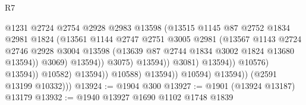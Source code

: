 \begin{lexlean}{R7}
\begin{coremodule}
                                              @1231
                                              @2724
                                              @2754
                                              @2928
                                              @2983
                                              @13598
                                              (@13515
                                                @1145
                                                @87
                                                @2752
                                                @1834
                                                @2981
                                                @1824
                                                (@13561
                                                  @1144
                                                  @2747
                                                  @2751
                                                  @3005
                                                  @2981
                                                  (@13567
                                                    @1143
                                                    @2724
                                                    @2746
                                                    @2928
                                                    @3004
                                                    @13598
                                                    (@13639
                                                      @87
                                                      @2744
                                                      @1834
                                                      @3002
                                                      @1824
                                                      @13680
                                                      @13594))
                                                  @3069)
                                                @13594))
                                            @3075)
                                          @13594))
                                      @3081)
                                    @13594))
                                @10576)
                              @13594))
                          @10582)
                        @13594))
                    @10588)
                  @13594))
              @10594)
            @13594))
        (@2591 @13199 @10332)))
@13924 := @1904 @300
@13927 := @1901 (@13924 @13187) @13179
@13932 := @1940 @13927 @1690 @1102 @1748 @1839

\end{coremodule}
\end{lexlean}
